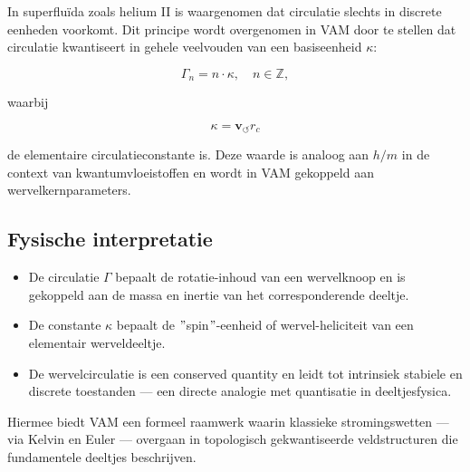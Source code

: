 In superfluïda zoals helium II is waargenomen dat circulatie slechts in discrete eenheden voorkomt. Dit principe wordt overgenomen in VAM door te stellen dat circulatie kwantiseert in gehele veelvouden van een basiseenheid \( \kappa \):

\begin{equation}
\Gamma_n = n \cdot \kappa, \quad n \in \mathbb{Z},
\end{equation}

waarbij

\begin{equation}
\kappa = \mathbf{v}_{\scriptscriptstyle\boldsymbol{\circlearrowleft}} r_c
\end{equation}

de elementaire circulatieconstante is. Deze waarde is analoog aan \( h/m \) in de context van kwantumvloeistoffen en wordt in VAM gekoppeld aan wervelkernparameters.

\subsection{Fysische interpretatie}

\begin{itemize}
    \item De circulatie \( \Gamma \) bepaalt de rotatie-inhoud van een wervelknoop en is gekoppeld aan de massa en inertie van het corresponderende deeltje.
    \item De constante \( \kappa \) bepaalt de \("\)spin\("\)-eenheid of wervel-heliciteit van een elementair werveldeeltje.
    \item De wervelcirculatie is een conserved quantity en leidt tot intrinsiek stabiele en discrete toestanden — een directe analogie met quantisatie in deeltjesfysica.
\end{itemize}

Hiermee biedt VAM een formeel raamwerk waarin klassieke stromingswetten — via Kelvin en Euler — overgaan in topologisch gekwantiseerde veldstructuren die fundamentele deeltjes beschrijven.